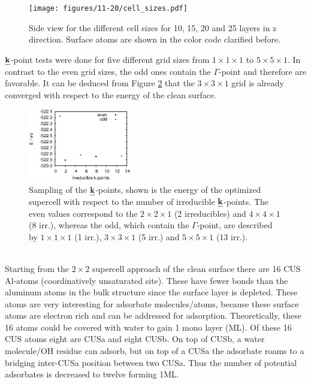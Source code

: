 \documentclass[11pt,DIV=13,BCOR=5mm,a4paper,headinclude]{scrbook}
\def\mathbi#1{\textbf{\em #1}}
\renewcommand{\vec}[1]{\mathbi{#1}}
\begin{document}
\begin{figure}[!h]
    \centering
    \texttt{[image: figures/11-20/cell\_sizes.pdf]}
             \caption{Side view for the different cell sizes for 10, 15, 20 and 25 layers in z direction.
Surface atoms are shown in the color code clarified before.}
            \label{abb:cell_sizes}
\end{figure}
$\vec{k}$-point tests were done for five different grid sizes from $1\times 1\times 1$ to $5\times 5\times 1$.
In contrast to the even grid sizes, the odd ones contain the $\Gamma$-point and therefore are favorable.
It can be deduced from Figure \ref{abb:11-20-kpointsampling} that the $3\times 3\times 1$ grid is already converged with respect to the energy of the clean surface.
\begin{figure}[!h]
\centering
 \includegraphics[width=0.4\textwidth]{figures/11-20/irreducibles-E.eps}
   \caption{Sampling of the $\vec{k}$-points, shown is the energy of the optimized supercell with respect to the number of irreducible $\vec{k}$-points.
The even values correspond to the $2\times 2 \times 1$ (2 irreducibles) and $4\times 4\times 1$ (8 irr.), whereas the odd, which contain the $\Gamma$-point, are described by $1\times 1\times 1$ (1 irr.), $3\times 3\times 1$ (5 irr.) and $5\times 5\times 1$ (13 irr.).}
            \label{abb:11-20-kpointsampling}
\end{figure}
\\
Starting from the $2\times 2$ supercell approach of the clean surface there are 16 CUS Al-atoms (coordinatively unsaturated site).
These have fewer bonds than the aluminum atoms in the bulk structure since the surface layer is  depleted.
These atoms are very interesting for adsorbate molecules/atoms, because these surface atoms are electron rich and can be addressed for adsorption.
Theoretically, these 16 atoms could be covered with water to gain 1 mono layer (ML).
Of these 16 CUS atoms eight are CUSa and eight CUSb.
On top of CUSb, a water molecule/OH residue can adsorb, but on top of a CUSa the adsorbate roams to a bridging inter-CUSa position between two CUSa.
Thus the number of potential adsorbates is decreased to twelve forming 1ML.
\end{document}
